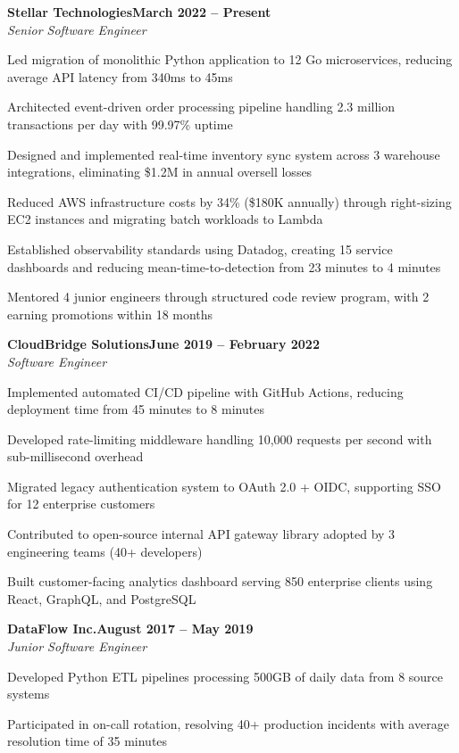 \documentclass[letterpaper,10pt]{article}
\newcommand{\heading}[2]{
  \hspace{10pt}#1\hfill#2\\
}
\newcommand{\headingBf}[2]{
  \heading{\textbf{#1}}{\textbf{#2}}
}
\newcommand{\headingIt}[2]{
  \heading{\textit{#1}}{\textit{#2}}
}
\newenvironment{resume_list}{
  \vspace{-7pt}
  \begin{itemize}[itemsep=-2px, parsep=1pt, leftmargin=30pt]
}{
  \end{itemize}
}
\begin{document}
  \headingBf{Stellar Technologies}{March 2022 -- Present}
  \headingIt{Senior Software Engineer}{}
  \begin{resume_list}
    \item Led migration of monolithic Python application to 12 Go microservices, reducing average API latency from 340ms to 45ms
    \item Architected event-driven order processing pipeline handling 2.3 million transactions per day with 99.97\% uptime
    \item Designed and implemented real-time inventory sync system across 3 warehouse integrations, eliminating \$1.2M in annual oversell losses
    \item Reduced AWS infrastructure costs by 34\% (\$180K annually) through right-sizing EC2 instances and migrating batch workloads to Lambda
    \item Established observability standards using Datadog, creating 15 service dashboards and reducing mean-time-to-detection from 23 minutes to 4 minutes
    \item Mentored 4 junior engineers through structured code review program, with 2 earning promotions within 18 months
  \end{resume_list}

  \headingBf{CloudBridge Solutions}{June 2019 -- February 2022}
  \headingIt{Software Engineer}{}
  \begin{resume_list}
    \item Implemented automated CI/CD pipeline with GitHub Actions, reducing deployment time from 45 minutes to 8 minutes
    \item Developed rate-limiting middleware handling 10,000 requests per second with sub-millisecond overhead
    \item Migrated legacy authentication system to OAuth 2.0 + OIDC, supporting SSO for 12 enterprise customers
    \item Contributed to open-source internal API gateway library adopted by 3 engineering teams (40+ developers)
    \item Built customer-facing analytics dashboard serving 850 enterprise clients using React, GraphQL, and PostgreSQL
  \end{resume_list}

  \headingBf{DataFlow Inc.}{August 2017 -- May 2019}
  \headingIt{Junior Software Engineer}{}
  \begin{resume_list}
    \item Developed Python ETL pipelines processing 500GB of daily data from 8 source systems
    \item Participated in on-call rotation, resolving 40+ production incidents with average resolution time of 35 minutes
  \end{resume_list}
\end{document}
